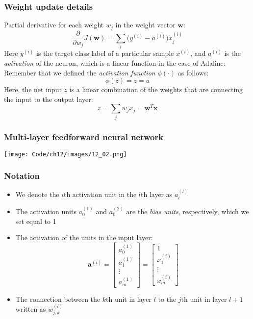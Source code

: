 \documentclass{beamer}
\begin{document}
\begin{frame}
  \frametitle{Weight update details}
  Partial derivative for each weight $w_j$ in the weight vector $\mathbf{w}$:
  \[
  \frac{\partial}{\partial w_j} J(\mathbf{w}) = \sum_i \big( y^{(i)} - a^{(i)} \big) x_{j}^{(i)}
  \]
  Here $y^{(i)}$ is the target class label of a particular sample $x^{(i)}$, and $a^{(i)}$ is the \textit{activation} of the neuron, which is a linear function in the case of Adaline: Remember that we defined the \textit{activation function} $\phi(\cdot)$ as follows:
  \[
  \phi(z) = z = a
  \]
  Here, the net input $z$  is a linear combination of the weights that are connecting the
  input to the output layer:
  \[
  z = \sum_j w_j x_j = \mathbf{w}^T \mathbf{x}
  \]
\end{frame}

\begin{frame}
  \frametitle{Multi-layer feedforward neural network}
  \center
  \texttt{[image: Code/ch12/images/12\_02.png]}  
\end{frame}

\begin{frame}
  \frametitle{Notation}
  \begin{itemize}
  \item We denote the $i$th activation unit in the $l$th layer as $a_{i}^{(l)}$
  \item The activation units $a_{0}^{(1)}$ and $a_{0}^{(2)}$ are the \textit{bias units}, respectively, which we set equal to 1
  \item The activation of the units in the input layer:
    \[
    \mathbf{a}^{(i)} = 
    \begin{bmatrix}
      a_{0}^{(1)} \\
      a_{1}^{(1)} \\
      \vdots \\
      a_{m}^{(1)}
    \end{bmatrix}
    = 
    \begin{bmatrix}
      1 \\
      x_{1}^{(i)} \\
      \vdots \\
      x_{m}^{(i)}
    \end{bmatrix}
    \]
    \item The connection between the $k$th unit in layer $l$ to the $j$th unit in layer
    $l+1$ written as $w^{(l)}_{j, k}$
  \end{itemize}
\end{frame}
\end{document}
